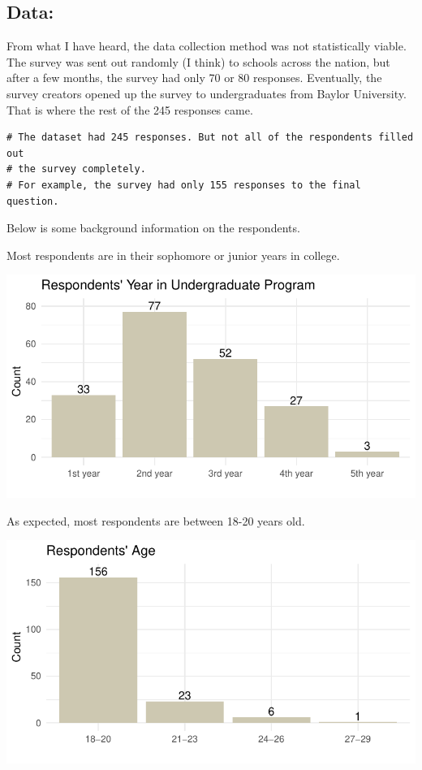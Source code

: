 \documentclass[
  letterpaper,
  DIV=11,
  numbers=noendperiod]{scrartcl}
\begin{document}
\newpage

\hypertarget{data}{%
\subsection{Data:}\label{data}}

From what I have heard, the data collection method was not statistically
viable. The survey was sent out randomly (I think) to schools across the
nation, but after a few months, the survey had only 70 or 80 responses.
Eventually, the survey creators opened up the survey to undergraduates
from Baylor University. That is where the rest of the 245 responses
came.

\begin{verbatim}
# The dataset had 245 responses. But not all of the respondents filled out 
# the survey completely.
# For example, the survey had only 155 responses to the final question.
\end{verbatim}

Below is some background information on the respondents.

Most respondents are in their sophomore or junior years in college.

\includegraphics{GlobalHealthQuartoHC_files/figure-pdf/unnamed-chunk-4-1.pdf}

\newpage

As expected, most respondents are between 18-20 years old.

\includegraphics{GlobalHealthQuartoHC_files/figure-pdf/unnamed-chunk-5-1.pdf}
\end{document}
